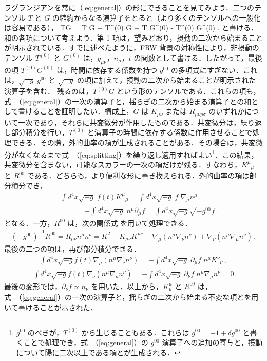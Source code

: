 ラグランジアンを常に（\ref{eq:general}）の形にできることを見てみよう．二つのテンソル $T$ と $G$ の縮約からなる演算子をとると（より多くのテンソルへの一般化は容易である），
\be
TG = \delta T \delta G + T^{(0)} G + T G^{(0)} - T^{(0)} G^{(0)} \;. \label{eq:splitting}
\ee
と書ける．和の各項について考えよう．第 1 項は，望みどおり，摂動の二次から始まることが明示されている．すでに述べたように，FRW 背景の対称性により，非摂動のテンソル $T^{(0)}$ と $G^{(0)}$ は，$g_{\mu\nu}$，$n_\mu$，$t$ の関数として書ける．したがって，最後の項 $T^{(0)} G^{(0)}$ は，時間に依存する係数を持つ $g^{00}$ の多項式にすぎない．これは，$\sqrt{-g}\;g^{00}$ と $\sqrt{-g}$ の項に加えて，摂動の二次から始まることが明示された演算子を含む．
残るのは，$T^{(0)} G$ という形のテンソルである．これらの項も，式~（\ref{eq:general}）の一次の演算子と，揺らぎの二次から始まる演算子との和として書けることを証明したい．構成上，$G$ は $K_{\mu\nu}$ または $R_{\mu\nu\rho\sigma}$ のいずれかについて一次であり，それらに共変微分が作用したものである．共変微分は，繰り返し部分積分を行い，$T^{(0)}$ と演算子の時間に依存する係数に作用させることで処理できる．その際，外的曲率の項が生成されることがある．その場合は，共変微分がなくなるまで式~（\ref{eq:splitting}）を繰り返し適用すればよい\footnote{$g^{00}$ のべきが，$T^{(0)}$ から生じることもある．これらは $g^{00} = -1 +\delta g^{00}$ と書くことで処理でき，式~（\ref{eq:general}）の $g^{00}$ 演算子への追加の寄与と，摂動について陽に二次以上である項とが生成される．}．この結果，共変微分を含まない，可能なスカラーの一次の項だけが残る．すなわち，$K^{\mu}  {}_{\mu}$ と $R^{00}$ である．どちらも，より便利な形に書き換えられる．外的曲率の項は部分積分でき，
\begin{eqnarray}
&&\int d^4x \sqrt{-g}\; f(t) K^{\mu} {}_{\mu} =\int d^4x \sqrt{-g}\; f\; \nabla_{\mu} n^{\mu}\nonumber \\ &&\qquad=-\int d^4 x \sqrt{-g} \;n^\mu \partial_\mu f =\int d^4x \sqrt{-g} \sqrt{-g^{00}} \dot f \,. 
\end{eqnarray}
となる．一方，$R^{00}$ は，次の関係式 \cite{Wald:1984rg} を用いて処理できる．
\begin{eqnarray}
(-g^{00})^{-1} R^{00}=R_{\mu\nu}n^\mu n^\nu = K^2 -K_{\mu\nu}K^{\mu\nu}-\nabla_\mu(n^\mu\nabla_\nu n^\nu)+\nabla_\nu(n^\mu \nabla_\mu n^\nu)\, .
\end{eqnarray}
最後の二つの項は，再び部分積分できる．
\begin{eqnarray}
\int d^4x \sqrt{-g} f(t) \nabla_\mu(n^\mu\nabla_\nu n^\nu)=-\int d^4x \sqrt{-g}\; \partial_\mu f\; n^\mu K^\nu {}_\nu\, ,
\end{eqnarray}
\begin{eqnarray}
\int d^4 x \sqrt{-g} f(t) \nabla_\nu(n^\mu \nabla_\mu n^\nu)=-\int d^4 x \sqrt{-g}\; \partial_\nu f\; n^\mu\nabla_\mu n^\nu =0
\end{eqnarray}
最後の変形では，$\partial_\nu f \propto n_\nu$ を用いた．以上から，$K^\mu_\mu$ と $R^{00}$ は，式~（\ref{eq:general}）の一次の演算子と，揺らぎの二次から始まる不変な項とを用いて書けることが示された．

